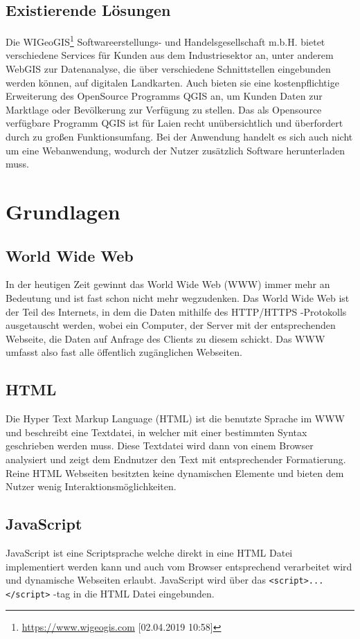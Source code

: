 \documentclass[a4paper, twoside, 12pt]{scrreprt}
\begin{document}
\section{Existierende Lösungen}
Die WIGeoGIS\footnote{\url{https://www.wigeogis.com} [02.04.2019 10:58]} Softwareerstellungs- und Handelsgesellschaft m.b.H. bietet verschiedene Services für Kunden aus dem Industriesektor an, unter anderem WebGIS zur Datenanalyse, die über verschiedene Schnittstellen eingebunden werden können, auf digitalen Landkarten. 
Auch bieten sie eine kostenpflichtige Erweiterung des OpenSource Programms QGIS an, um Kunden Daten zur Marktlage oder Bevölkerung zur Verfügung zu stellen.
Das als Opensource verfügbare Programm QGIS ist für Laien recht unübersichtlich und überfordert durch zu großen Funktionsumfang. Bei der Anwendung handelt es sich auch nicht um eine Webanwendung, wodurch der Nutzer zusätzlich Software herunterladen muss.

\chapter{Grundlagen}
\section{World Wide Web}
In der heutigen Zeit gewinnt das World Wide Web (WWW) immer mehr an Bedeutung und ist fast schon nicht mehr wegzudenken.
Das World Wide Web ist der Teil des Internets, in dem die Daten mithilfe des HTTP/HTTPS -Protokolls ausgetauscht werden, wobei ein Computer, der Server mit der entsprechenden Webseite, die Daten auf Anfrage des Clients zu diesem schickt.
Das WWW umfasst also fast alle öffentlich zugänglichen Webseiten.
\section{HTML}
Die Hyper Text Markup Language (HTML) ist die benutzte Sprache im WWW und beschreibt eine Textdatei, in welcher mit einer bestimmten Syntax geschrieben werden muss.
Diese Textdatei wird dann von einem Browser analysiert und zeigt dem Endnutzer den Text mit entsprechender Formatierung.
Reine HTML Webseiten besitzten keine dynamischen Elemente und bieten dem Nutzer wenig Interaktionsmöglichkeiten.
\section{JavaScript}
JavaScript ist eine Scriptsprache welche direkt in eine HTML Datei implementiert werden kann und auch vom Browser entsprechend verarbeitet wird und dynamische Webseiten erlaubt.
JavaScript wird über das \verb+<script>...</script>+ -tag in die HTML Datei eingebunden.
\end{document}
